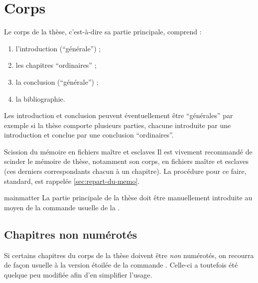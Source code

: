 \chapter{Corps}\label{cha:corps}

Le corps de la thèse, c'est-à-dire sa partie principale, comprend :
\begin{enumerate}
\item l'introduction (\enquote{générale}) ;
\item les chapitres \enquote{ordinaires} ;
\item la conclusion (\enquote{générale}) ;
\item la bibliographie.
\end{enumerate}
Les introduction et conclusion peuvent éventuellement être
\enquote{générales} par exemple si la thèse comporte plusieurs
parties, chacune introduite par une introduction et conclue par
une conclusion \enquote{ordinaires}.

\begin{dbremark}{Scission du mémoire en fichiers maître et esclaves}{}
  Il est vivement recommandé de scinder le mémoire de thèse,
  notamment son corps, en fichiers maître et esclaves (ces derniers
  correspondants chacun à un chapitre). La procédure
  pour ce faire, standard, est rappelée \vref{sec:repart-du-memo}.
\end{dbremark}

\begin{docCommand}[doc description=\mandatory]{mainmatter}{}
  La partie principale de la thèse doit être manuellement introduite au moyen
  de la commande usuelle  de la
  \nofrontmatter.
\end{docCommand}

\section{Chapitres non numérotés}
\label{sec:chap-non-numer}

Si certains chapitres du corps de la thèse  doivent être \emph{non} numérotés, on recourra de
façon usuelle à la version étoilée de la commande
. Celle-ci a toutefois été quelque peu modifiée afin
d'en simplifier l'usage.

